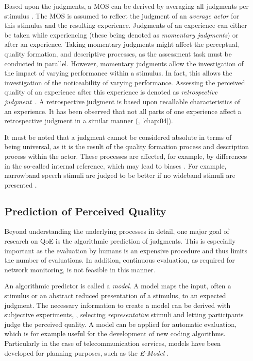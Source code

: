 Based upon the judgments, a \acf{MOS} can be derived by averaging all judgments per stimulus \citep{itu-t_recommendation_p.800.2_mean_2013}.
The \ac{MOS} is assumed to reflect the judgment of an \emph{average actor} for this stimulus and the resulting experience.
Judgments of an experience can either be taken while experiencing (these being denoted as \emph{momentary judgments}) or after an experience.
Taking momentary judgments might affect the perceptual, quality formation, and descriptive processes, as the assessment task must be conducted in parallel. %
However, momentary judgments allow the investigation of the impact of varying performance within a stimulus.
In fact, this allows the investigation of the noticeability of varying performance.
Assessing the perceived quality of an experience after this experience is denoted as \emph{retrospective judgment}~\citep[][]{weiss_temporal_2014}.
A retrospective judgment is based upon recallable characteristics of an experience.
It has been observed that not all parts of one experience affect a retrospective judgment in a similar manner (\cf, \autoref{chap:04}).

It must be noted that a judgment cannot be considered absolute in terms of being universal, as it is the result of the quality formation process and description process within the actor.
These processes are affected, for example, by differences in the so-called internal reference, which may lead to biases \citep[][]{zielinski_biases_2008, pitrey_aligning_2011}.
For example, narrowband speech stimuli are judged to be better if no wideband stimuli are presented \citep[][]{koster_comparison_2015}.

\subsection{Prediction of Perceived Quality}
Beyond understanding the underlying processes in detail, one major goal of research on \ac{QoE} is the algorithmic prediction of judgments.
This is especially important as the evaluation by humans is an expensive procedure and thus limits the number of evaluations.
In addition, continuous evaluation, as required for network monitoring, is not feasible in this manner.

An algorithmic predictor is called a \emph{model}.
A model maps the input, often a stimulus or an abstract reduced presentation of a stimulus, to an expected judgment.
The necessary information to create a model can be derived with subjective experiments, \ie, selecting \emph{representative} stimuli and letting participants judge the perceived quality.
A model can be applied for automatic evaluation, which is for example useful for the development of new coding algorithms.
Particularly in the case of telecommunication services, models have been developed for planning purposes, such as the \emph{E-Model} \citep{itu-t_recommendation_g.107_e-model_2015}.

